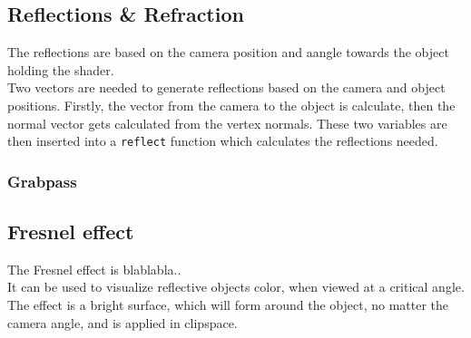 \documentclass{article}
\begin{document}
\subsection{Reflections \& Refraction}
\label{sec:refl_refr}
The reflections are based on the camera position and aangle towards the object holding the shader.\\

Two vectors are needed to generate reflections based on the camera and object positions. Firstly, the vector from the camera to the object is calculate, then the normal vector gets calculated from the vertex normals. These two variables are then inserted into a \texttt{reflect} function which calculates the reflections needed.

\subsubsection{Grabpass}
\label{sec:grabpass}

\subsection{Fresnel effect}
\label{sec:fresnel_effect}
The Fresnel effect is blablabla..\\It can be used to visualize reflective objects color, when viewed at a critical angle. The effect is a bright surface, which will form around the object, no matter the camera angle, and is applied in clipspace.



\end{document}
